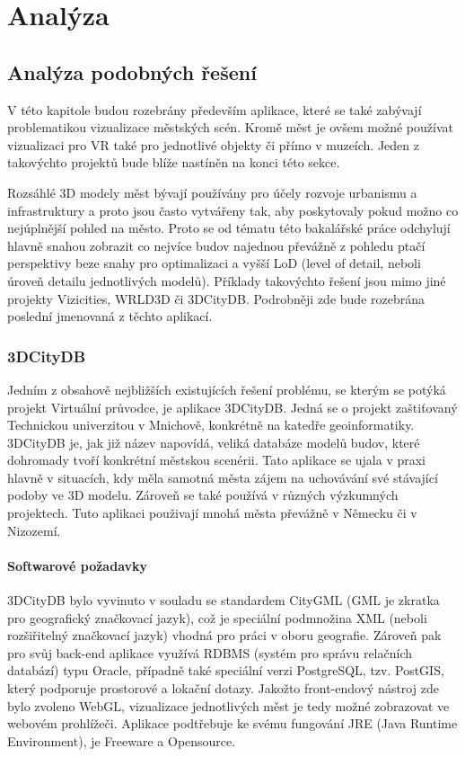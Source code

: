 \documentclass[thesis=B,czech]{FITthesis}[2012/06/26]
\begin{document}
\chapter{Analýza}
	\section{Analýza podobných řešení}
	
		 V této kapitole budou rozebrány především aplikace, které se také zabývají problematikou vizualizace městských scén.	Kromě měst je ovšem možné používat vizualizaci pro VR také pro jednotlivé objekty či přímo v muzeích. Jeden z takovýchto projektů bude blíže nastíněn na konci této sekce.	
		  
		 Rozsáhlé 3D modely měst bývají používány pro účely rozvoje urbanismu a infrastruktury a proto jsou často vytvářeny tak, aby poskytovaly pokud možno co nejúplnější pohled na město. Proto se od tématu této bakalářské práce odchylují hlavně snahou zobrazit co nejvíce budov najednou převážně z pohledu ptačí perspektivy beze snahy pro optimalizaci a vyšší LoD (level of detail, neboli úroveň detailu jednotlivých modelů). Příklady takovýchto řešení jsou mimo jiné projekty Vizicities, WRLD3D či 3DCityDB. Podrobněji zde bude rozebrána poslední jmenovaná z těchto aplikací.

 \subsection{3DCityDB}
    
    Jedním z obsahově nejbližších existujících řešení problému, se kterým se potýká projekt Virtuální průvodce, je aplikace 3DCityDB. Jedná se o projekt zaštiťovaný Technickou univerzitou v Mnichově, konkrétně na katedře geoinformatiky. 3DCityDB je, jak již název napovídá, veliká databáze modelů budov, které dohromady tvoří konkrétní městskou scenérii. Tato aplikace se ujala v praxi hlavně v situacích, kdy měla samotná města zájem na uchovávání své stávající podoby ve 3D modelu. Zároveň se také používá v různých výzkumných projektech. Tuto aplikaci použivají mnohá města převážně v Německu či v Nizozemí. \cite{3DCityDB}
        
        \subsubsection{Softwarové požadavky}
        
    
        3DCityDB bylo vyvinuto v souladu se standardem CityGML (GML je zkratka pro geografický značkovací jazyk), což je speciální podmnožina XML (neboli rozšiřitelný značkovací jazyk) vhodná pro práci v oboru geografie. Zároveň pak pro svůj back-end aplikace využívá RDBMS (systém pro správu relačních databází) typu Oracle, případně také speciální verzi PostgreSQL, tzv. PostGIS, který podporuje prostorové a lokační dotazy. Jakožto front-endový nástroj zde bylo zvoleno WebGL, vizualizace jednotlivých měst je tedy možné zobrazovat ve webovém prohlížeči. Aplikace podtřebuje ke svému fungování JRE (Java Runtime Environment), je Freeware a Opensource. \cite{3DCityDB}
        
\end{document}
